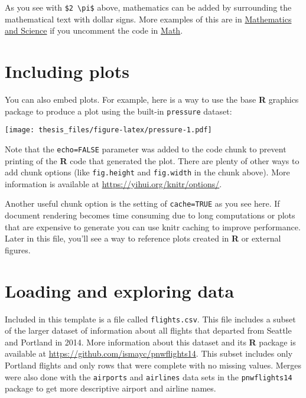 As you see with \texttt{\$2\ \textbackslash{}pi\$} above, mathematics can be added by surrounding the mathematical text with dollar signs. More examples of this are in \protect\hyperlink{math-sci}{Mathematics and Science} if you uncomment the code in \protect\hyperlink{math}{Math}.

\hypertarget{including-plots}{%
\section{Including plots}\label{including-plots}}

You can also embed plots. For example, here is a way to use the base \textbf{R} graphics package to produce a plot using the built-in \texttt{pressure} dataset:

\texttt{[image: thesis\_files/figure-latex/pressure-1.pdf]}

Note that the \texttt{echo=FALSE} parameter was added to the code chunk to prevent printing of the \textbf{R} code that generated the plot. There are plenty of other ways to add chunk options (like \texttt{fig.height} and \texttt{fig.width} in the chunk above). More information is available at \url{https://yihui.org/knitr/options/}.

Another useful chunk option is the setting of \texttt{cache=TRUE} as you see here. If document rendering becomes time consuming due to long computations or plots that are expensive to generate you can use knitr caching to improve performance. Later in this file, you'll see a way to reference plots created in \textbf{R} or external figures.

\hypertarget{loading-and-exploring-data}{%
\section{Loading and exploring data}\label{loading-and-exploring-data}}

Included in this template is a file called \texttt{flights.csv}. This file includes a subset of the larger dataset of information about all flights that departed from Seattle and Portland in 2014. More information about this dataset and its \textbf{R} package is available at \url{https://github.com/ismayc/pnwflights14}. This subset includes only Portland flights and only rows that were complete with no missing values. Merges were also done with the \texttt{airports} and \texttt{airlines} data sets in the \texttt{pnwflights14} package to get more descriptive airport and airline names.


